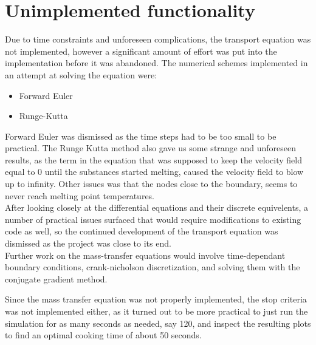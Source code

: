 \section{Unimplemented functionality}

Due to time constraints and unforeseen complications, the transport equation was not implemented, 
however a significant amount of effort was put into the implementation before it was 
abandoned. The numerical schemes implemented in an attempt at solving the
equation were:

\begin{itemize}
  \item Forward Euler
  \item Runge-Kutta
\end{itemize} 

Forward Euler was dismissed as the time steps had to be too small to be practical.
The Runge Kutta method also gave us some strange and unforeseen results, as the term in 
the equation that was supposed to keep the velocity field equal to $0$ until the substances
started melting, caused the velocity field to blow up to infinity. Other issues was that
the nodes close to the boundary, seems to never reach melting point
temperatures.\\

After looking closely at the differential equations and their discrete equivelents, a number
of practical issues surfaced that would require modifications to existing code
as well, so the continued development of the transport equation was dismissed
as the project was close to its end.\\

Further work on the mass-transfer equations would involve time-dependant boundary conditions,
crank-nicholson discretization, and solving them with the conjugate gradient method.

Since the mass transfer equation was not properly implemented, the stop criteria was not 
implemented either, as it turned out to be more practical to just run the simulation for as 
many seconds as needed, say 120, and inspect the resulting plots to find an
optimal cooking time of about 50 seconds.
